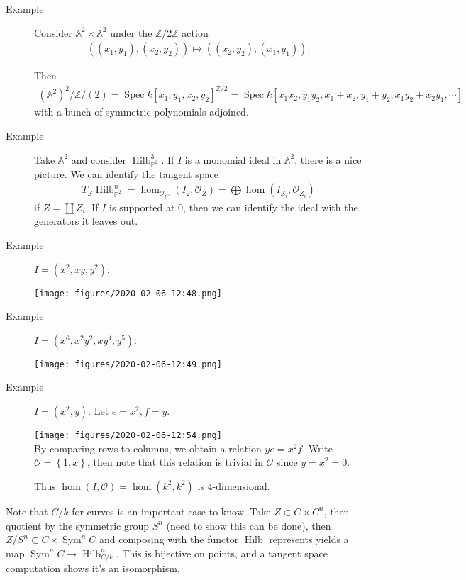 \begin{description}
\item[Example]
Consider \({\mathbb{A}}^2 \times{\mathbb{A}}^2\) under the
\({\mathbb{Z}}/2{\mathbb{Z}}\) action
\begin{align*}
( (x_1, y_1), (x_2, y_2)) \mapsto ((x_2, y_2), (x_1, y_1))
.\end{align*}

Then
\begin{align*}
({\mathbb{A}}^2)^2 / {\mathbb{Z}}/(2) = \operatorname{Spec}k[x_1, y_1, x_2, y_2]^{{\mathbb{Z}}/2} = \operatorname{Spec}k[x_1 x_2, y_1 y_2, x_1 + x_2, y_1 + y_2, x_1 y_2 + x_2 y_1, \cdots]
\end{align*}
with a bunch of symmetric polynomials adjoined.
\item[Example]
Take \({\mathbb{A}}^2\) and consider
\(\operatorname{Hilb}_{{\mathbb{P}}^2}^3\). If \(I\) is a monomial ideal
in \({\mathbb{A}}^2\), there is a nice picture. We can identify the
tangent space
\begin{align*}
T_Z \operatorname{Hilb}_{{\mathbb{P}}^2}^n = \hom_{{\mathcal{O}}_{{\mathbb{P}}^2}} ( I_2, {\mathcal{O}}_Z) = \bigoplus \hom(I_{Z_i}, {\mathcal{O}}_{Z_i})
\end{align*}
if \(Z = {\coprod}Z_i\). If \(I\) is supported at 0, then we can
identify the ideal with the generators it leaves out.
\item[Example]
\(I = (x^2, xy, y^2)\):

\texttt{[image: figures/2020-02-06-12:48.png]}\\
\item[Example]
\(I = (x^6, x^2y^2, xy^4, y^5)\):

\texttt{[image: figures/2020-02-06-12:49.png]}\\
\item[Example]
\(I = (x^2, y)\). Let \(e=x^2, f = y\).

\texttt{[image: figures/2020-02-06-12:54.png]}\\

By comparing rows to columns, we obtain a relation \(ye = x^2 f\). Write
\({\mathcal{O}}= \left\{{1, x}\right\}\), then note that this relation
is trivial in \({\mathcal{O}}\) since \(y=x^2=0\).

Thus \(\hom(I, {\mathcal{O}}) = \hom(k^2, k^2)\) is 4-dimensional.
\end{description}

Note that \(C/k\) for curves is an important case to know. Take
\(Z \subset C \times C^n\), then quotient by the symmetric group \(S^n\)
(need to show this can be done), then
\(Z/S^n \subset C \times\operatorname{Sym}^n C\) and composing with the
functor \(\operatorname{Hilb}\) represents yields a map
\(\operatorname{Sym}^n C \to \operatorname{Hilb}_{C/k}^n\). This is
bijective on points, and a tangent space computation shows it's an
isomorphism.

